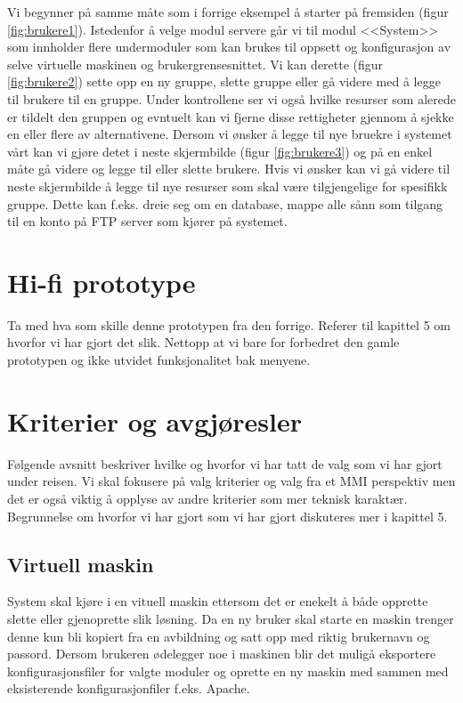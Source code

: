 Vi begynner på samme måte som i forrige eksempel å starter på fremsiden (figur \ref{fig:brukere1}). Istedenfor å velge modul servere går vi til modul <<System>> som innholder flere undermoduler som kan brukes til oppsett og konfigurasjon av selve virtuelle maskinen og brukergrensesnittet. 
Vi kan derette (figur \ref{fig:brukere2}) sette opp en ny gruppe, slette gruppe eller gå videre med å legge til brukere til en gruppe. Under kontrollene ser vi også hvilke resurser som alerede er tildelt den gruppen og evntuelt kan vi fjerne disse rettigheter gjennom å sjekke en eller flere av alternativene.
Dersom vi ønsker å legge til nye bruekre i systemet vårt kan vi gjøre detet i neste skjermbilde (figur \ref{fig:brukere3}) og på en enkel måte gå videre og legge til eller slette brukere.
Hvis vi ønsker kan vi gå videre til neste skjermbilde å legge til nye resurser som skal være tilgjengelige for spesifikk gruppe. Dette kan f.eks. dreie seg om en database, mappe alle sånn som tilgang til en konto på FTP server som kjører på systemet. 

\section{Hi-fi prototype}

Ta med hva som skille denne prototypen fra den forrige. Referer til kapittel 5 om hvorfor vi har gjort det slik. Nettopp at vi bare for forbedret den gamle prototypen og ikke utvidet funksjonalitet bak menyene.\\

\section{Kriterier og avgjøresler}
Følgende avsnitt beskriver hvilke og hvorfor vi har tatt de valg som vi har gjort under reisen. Vi skal fokusere på valg kriterier og valg fra et MMI perspektiv men det er også viktig å opplyse av andre kriterier som mer teknisk karaktær.\\
Begrunnelse om hvorfor vi har gjort som vi har gjort diskuteres mer i kapittel 5.

\subsection{Virtuell maskin}
System skal kjøre i en vituell maskin ettersom det er enekelt å både opprette slette eller gjenoprette slik løsning. Da en ny bruker skal starte en maskin trenger denne kun bli kopiert fra en avbildning og satt opp med riktig brukernavn og passord. Dersom brukeren ødelegger noe i maskinen blir det muligå eksportere konfigurasjonsfiler for valgte moduler og oprette en ny maskin med sammen med eksisterende konfigurasjonfiler f.eks. Apache.

